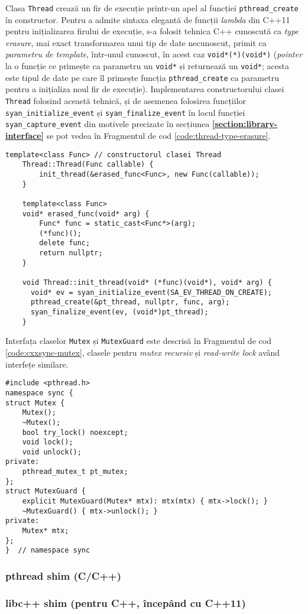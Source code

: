 Clasa \lstinline{Thread} crează un fir de execuție printr-un apel al
funcției \lstinline{pthread_create} în constructor. Pentru a admite
sintaxa elegantă de funcții \textit{lambda} din C++11 pentru
inițializarea firului de execuție, s-a folosit tehnica C++ cunoscută ca
\textit{type erasure}\cite{TypeErasure}, mai exact transformarea unui
tip de date necunoscut, primit ca \textit{parametru de template},
într-unul cunoscut, în acest caz \lstinline{void*(*)(void*)}
(\textit{pointer} la o funcție ce primește ca parametru un
\lstinline{void*} și returnează un \lstinline{void*}; acesta este tipul
de date pe care îl primește funcția \lstinline{pthread_create} ca
parametru pentru a inițializa noul fir de execuție). Implementarea
constructorului clasei \lstinline{Thread} folosind această tehnică,
și de asemenea folosirea funcțiilor \lstinline{syan_initialize_event} și
\lstinline{syan_finalize_event} în locul funcției
\lstinline{syan_capture_event} din motivele precizate în secțiunea
\textbf{\ref{section:library-interface}} se pot vedea în Fragmentul de
cod \ref{code:thread-type-erasure}.
\begin{lstlisting}[caption=Tehnica \textit{type-erasure} în
                           implementarea clasei \lstinline{Thread} din
                           \lstinline{cxxsync},
                   float, floatplacement=H,
                   label=code:thread-type-erasure]
    template<class Func> // constructorul clasei Thread
    Thread::Thread(Func callable) {
        init_thread(&erased_func<Func>, new Func(callable));
    }

    template<class Func>
    void* erased_func(void* arg) {
        Func* func = static_cast<Func*>(arg);
        (*func)();
        delete func;
        return nullptr;
    }

    void Thread::init_thread(void* (*func)(void*), void* arg) {
      void* ev = syan_initialize_event(SA_EV_THREAD_ON_CREATE);
      pthread_create(&pt_thread, nullptr, func, arg);
      syan_finalize_event(ev, (void*)pt_thread);
    }
\end{lstlisting}
Interfața claselor \lstinline{Mutex} și \lstinline{MutexGuard} este
descrisă în Fragmentul de cod \ref{code:cxxsync-mutex}, clasele pentru
\textit{mutex recursiv} și \textit{read-write lock} având interfețe
similare.
\begin{lstlisting}[caption=Interfața claselor \lstinline{Mutex} și
                           \lstinline{MutexGuard} din biblioteca
                           \lstinline{cxxsync},
                   float, floatplacement=H, label=code:cxxsync-mutex]
#include <pthread.h>
namespace sync {
struct Mutex {
    Mutex();
    ~Mutex();
    bool try_lock() noexcept;
    void lock();
    void unlock();
private:
    pthread_mutex_t pt_mutex;
};
struct MutexGuard {
    explicit MutexGuard(Mutex* mtx): mtx(mtx) { mtx->lock(); }
    ~MutexGuard() { mtx->unlock(); }
private:
    Mutex* mtx;
};
}  // namespace sync
\end{lstlisting}

\subsubsection{pthread shim (C/C++)}

\subsubsection{libc++ shim (pentru C++, începând cu C++11)}
